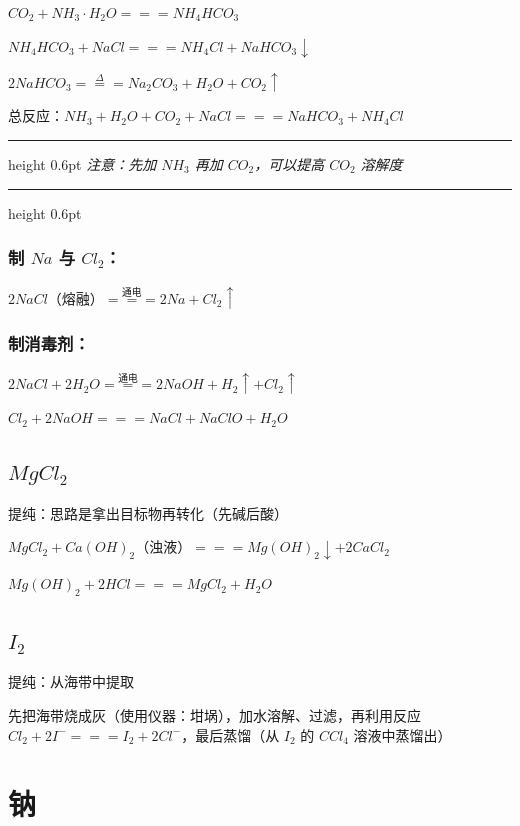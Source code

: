 \documentclass[UTF8,zihao=-4,openany]{ctexbook}
\newenvironment{notebox}
  {\par\smallskip\noindent\begingroup\begin{minipage}{\linewidth}\color{noteframe}\hrule height 0.6pt\smallskip\color{black}\itshape}
  {\par\smallskip\color{noteframe}\hrule height 0.6pt\end{minipage}\endgroup\par\smallskip}
\begin{document}
$CO_2+NH_3\cdot H_2O=\!=\!=NH_4HCO_3$\par

$NH_4HCO_3+NaCl=\!=\!=NH_4Cl+NaHCO_3\downarrow$\par

$2NaHCO_3\stackrel{\Delta}{=\!=\!=}Na_2CO_3+H_2O+CO_2\uparrow$\par

总反应：$NH_3+H_2O+CO_2+NaCl=\!=\!=NaHCO_3+NH_4Cl$\par
\begin{notebox}
注意：先加 $NH_3$ 再加 $CO_2$，可以提高 $CO_2$ 溶解度\par
\end{notebox}
\subsubsection{制 $Na$ 与 $Cl_2$：}
$2NaCl$（熔融）$\stackrel{\mbox{通电}}{=\!=\!=}2Na+Cl_2\uparrow$\par

\subsubsection{制消毒剂：}
$2NaCl+2H_2O\stackrel{\mbox{通电}}{=\!=\!=}2NaOH+H_2\uparrow+Cl_2\uparrow$\par

$Cl_2+2NaOH=\!=\!=NaCl+NaClO+H_2O$\par
\subsection{$MgCl_2$}
提纯：思路是拿出目标物再转化（先碱后酸）\par

$MgCl_2+Ca(OH)_2$（浊液）$=\!=\!=Mg(OH)_2\downarrow+2CaCl_2$\par

$Mg(OH)_2+2HCl=\!=\!=MgCl_2+H_2O$\par
\subsection{$I_2$}
提纯：从海带中提取\par

先把海带烧成灰（使用仪器：坩埚），加水溶解、过滤，再利用反应 $Cl_2+2I^-=\!=\!=I_2+2Cl^-$，最后蒸馏（从 $I_2$ 的 $CCl_4$ 溶液中蒸馏出）\par
\section{钠}
\end{document}
